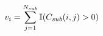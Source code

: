 \vspace{-0.1cm}
\begin{equation}
    v_i = \sum_{j=1}^{N_{sub}} \mathbb{I}(C_{sub}(i, j) > 0)
    \label{eq:forward-pass}
    \vspace{-0.05cm}
\end{equation}
